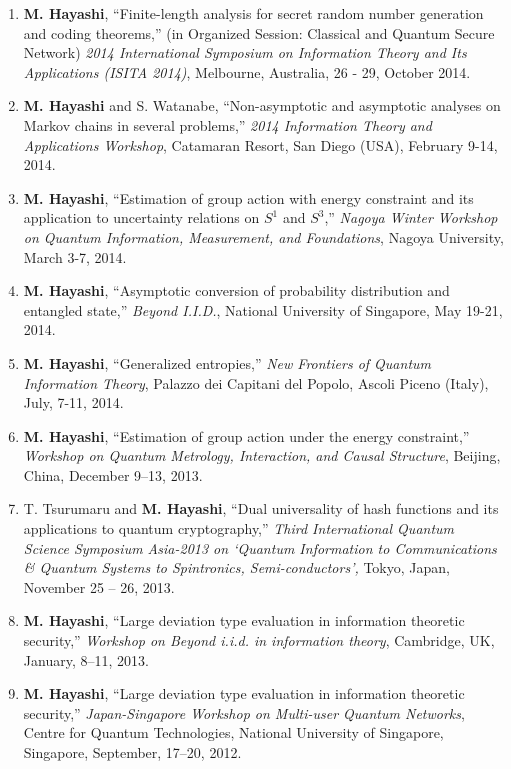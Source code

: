 \documentclass[a4paper,12pt,oneside]{article}
\begin{document}
\begin{enumerate}
\item 
\textbf{M. Hayashi},
``Finite-length analysis for secret random number generation and coding theorems,'' 
(in Organized Session: Classical and Quantum Secure Network) 
{\em 2014 International Symposium on Information Theory and Its Applications (ISITA 2014)}, Melbourne, Australia, 26 - 29, October 2014.

\item 
\textbf{M. Hayashi} and S. Watanabe, 
``Non-asymptotic and asymptotic analyses on Markov chains in several problems,'' 
{\em 2014 Information Theory and Applications Workshop}, 
Catamaran Resort, San Diego (USA), February 9-14, 2014.

\item 
\textbf{M. Hayashi}, 
``Estimation of group action with energy constraint and its application to uncertainty relations on $S^1$ and $S^3$,'' 
{\em Nagoya Winter Workshop on Quantum Information, Measurement, and Foundations}, 
Nagoya University, March 3-7, 2014.

\item 
\textbf{M. Hayashi}, 
``Asymptotic conversion of probability distribution and entangled state,'' {\em Beyond I.I.D.}, National University of Singapore, May 19-21, 2014.

\item 
\textbf{M. Hayashi}, 
``Generalized entropies,''
{\em New Frontiers of Quantum Information Theory}, 
Palazzo dei Capitani del Popolo, Ascoli Piceno (Italy),  July, 7-11, 2014.


\item 
\textbf{M. Hayashi}, 
``Estimation of group action under the energy constraint,''
{\em Workshop on Quantum Metrology, Interaction, and Causal Structure},
Beijing, China, December 9--13, 2013. 

\item 
T. Tsurumaru and \textbf{M. Hayashi}, 
``Dual universality of hash functions and its applications to quantum
cryptography,''
{\em Third International Quantum Science Symposium Asia-2013
on `Quantum Information to Communications \& Quantum Systems to Spintronics, Semi-conductors',}
Tokyo, Japan, November 25 -- 26, 2013.

\item 
\textbf{M. Hayashi}, 
``Large deviation type evaluation in information theoretic security,''
{\em Workshop on Beyond i.i.d. in information theory},
Cambridge, UK, January, 8--11, 2013.

\item 
\textbf{M. Hayashi}, 
``Large deviation type evaluation in information theoretic security,'' 
{\em Japan-Singapore Workshop on Multi-user Quantum Networks}, 
Centre for Quantum Technologies, National University of Singapore, Singapore, September, 17--20, 2012.



\end{enumerate}
\end{document}
